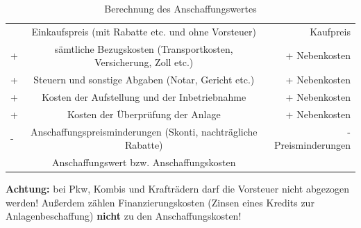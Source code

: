 \documentclass[a4paper,10pt]{report}
\begin{document}
\begin{table}[h]
  \centering
  \begin{tabular}{l c r}
      & Einkaufspreis (mit Rabatte etc. und ohne Vorsteuer) & Kaufpreis\\

    + & sämtliche Bezugskosten (Transportkosten, Versicherung, Zoll
    etc.) & + Nebenkosten\\

    + & Steuern und sonstige Abgaben (Notar, Gericht etc.) & +
    Nebenkosten\\

    + & Kosten der Aufstellung und der Inbetriebnahme & +
    Nebenkosten\\

    + & Kosten der Überprüfung der Anlage & + Nebenkosten\\

    - & Anschaffungspreisminderungen (Skonti, nachträgliche Rabatte) &
    - Preisminderungen\\

    \hline

      & Anschaffungswert bzw. Anschaffungskosten\\
  \end{tabular}
  \caption{Berechnung des Anschaffungswertes}
\end{table}

\textbf{Achtung:} bei Pkw, Kombis und Krafträdern darf die Vorsteuer
nicht abgezogen werden! Außerdem zählen Finanzierungskosten (Zinsen
eines Kredits zur Anlagenbeschaffung) \textbf{nicht} zu den
Anschaffungskosten!
\end{document}
